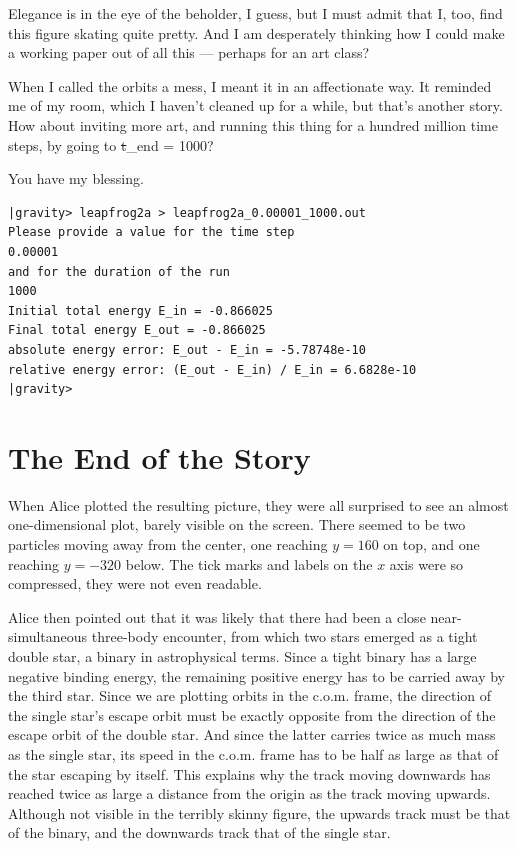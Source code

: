 \bob
Elegance is in the eye of the beholder, I guess, but I must admit that
I, too, find this figure skating quite pretty.  And I am desperately
thinking how I could make a working paper out of all this --- perhaps
for an art class?

\alice
When I called the orbits a mess, I meant it in an affectionate way.
It reminded me of my room, which I haven't cleaned up for a while, but
that's another story.  How about inviting more art, and running this
thing for a hundred million time steps, by going to {\st t\_end = 1000}?

\bob
You have my blessing.

\cba

\begin{small}
\begin{verbatim}
|gravity> leapfrog2a > leapfrog2a_0.00001_1000.out
Please provide a value for the time step
0.00001
and for the duration of the run
1000
Initial total energy E_in = -0.866025
Final total energy E_out = -0.866025
absolute energy error: E_out - E_in = -5.78748e-10
relative energy error: (E_out - E_in) / E_in = 6.6828e-10
|gravity>
\end{verbatim}
\end{small}

\section{The End of the Story}

When Alice plotted the resulting picture, they were all surprised to
see an almost one-dimensional plot, barely visible on the screen.
There seemed to be two particles moving away from the center, one
reaching $y=160$ on top, and one reaching $y=-320$ below.  The
tick marks and labels on the $x$ axis were so compressed, they were not
even readable.

Alice then pointed out that it was likely that there had been a close
near-simultaneous three-body encounter, from which two stars emerged
as a tight double star, a binary in astrophysical terms.  Since a
tight binary has a large negative binding energy, the remaining
positive energy has to be carried away by the third star.  Since we
are plotting orbits in the c.o.m. frame, the direction of the single
star's escape orbit must be exactly opposite from the direction of the
escape orbit of the double star.  And since the latter carries twice
as much mass as the single star, its speed in the c.o.m. frame has to
be half as large as that of the star escaping by itself.  This explains
why the track moving downwards has reached twice as large a distance
from the origin as the track moving upwards.  Although not visible in
the terribly skinny figure, the upwards track must be that of the
binary, and the downwards track that of the single star.

